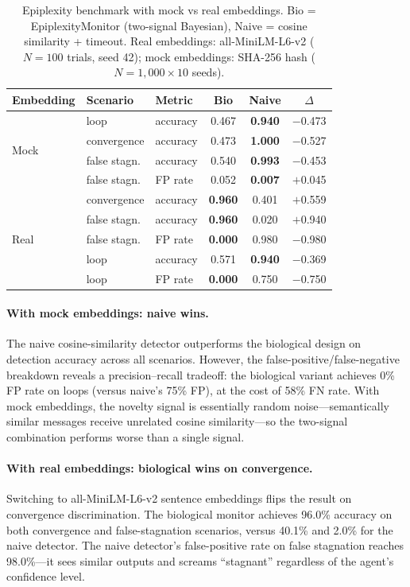 \begin{table}[h]
\caption{Epiplexity benchmark with mock vs real embeddings.  Bio =
EpiplexityMonitor (two-signal Bayesian), Naive = cosine similarity +
timeout.  Real embeddings: all-MiniLM-L6-v2 ($N = 100$ trials, seed
42); mock embeddings: SHA-256 hash ($N = 1{,}000 \times 10$ seeds).}
\label{tab:epiplexity}
\centering
\small
\begin{tabular}{lll ccc}
\toprule
Embedding & Scenario & Metric & Bio & Naive & $\Delta$ \\
\midrule
\multirow{4}{*}{Mock}
  & loop & accuracy & 0.467 & \textbf{0.940} & $-$0.473 \\
  & convergence & accuracy & 0.473 & \textbf{1.000} & $-$0.527 \\
  & false stagn. & accuracy & 0.540 & \textbf{0.993} & $-$0.453 \\
  & false stagn. & FP rate & 0.052 & \textbf{0.007} & $+$0.045 \\
\midrule
\multirow{5}{*}{Real}
  & convergence & accuracy & \textbf{0.960} & 0.401 & $+$0.559 \\
  & false stagn. & accuracy & \textbf{0.960} & 0.020 & $+$0.940 \\
  & false stagn. & FP rate & \textbf{0.000} & 0.980 & $-$0.980 \\
  & loop & accuracy & 0.571 & \textbf{0.940} & $-$0.369 \\
  & loop & FP rate & \textbf{0.000} & 0.750 & $-$0.750 \\
\bottomrule
\end{tabular}
\end{table}

\paragraph{With mock embeddings: naive wins.}
The naive cosine-similarity detector outperforms the biological design
on detection accuracy across all scenarios.  However, the
false-positive/false-negative breakdown reveals a precision--recall
tradeoff: the biological variant achieves 0\% FP rate on loops (versus
naive's 75\% FP), at the cost of 58\% FN rate.  With mock embeddings,
the novelty signal is essentially random noise---semantically similar
messages receive unrelated cosine similarity---so the two-signal
combination performs worse than a single signal.

\paragraph{With real embeddings: biological wins on convergence.}
Switching to all-MiniLM-L6-v2 sentence embeddings flips the result
on convergence discrimination.  The biological monitor achieves
96.0\% accuracy on both convergence and false-stagnation scenarios,
versus 40.1\% and 2.0\% for the naive detector.  The naive detector's
false-positive rate on false stagnation reaches 98.0\%---it sees
similar outputs and screams ``stagnant'' regardless of the agent's
confidence level.

